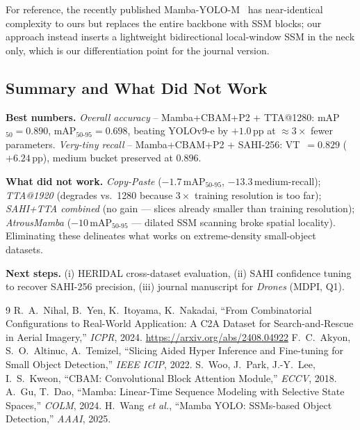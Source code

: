 \documentclass[11pt,a4paper]{article}
\begin{document}
For reference, the recently published Mamba-YOLO-M~\cite{wang2025mambayolo}
has near-identical complexity to ours but replaces the entire backbone
with SSM blocks; our approach instead inserts a lightweight
bidirectional local-window SSM in the neck only, which is our
differentiation point for the journal version.

\subsection{Summary and What Did Not Work}
\textbf{Best numbers.} \emph{Overall accuracy} -- Mamba+CBAM+P2 +
TTA@1280: mAP$_{50}\!=\!0.890$, mAP$_{50\text{-}95}\!=\!0.698$,
beating YOLOv9-e by $+1.0$\,pp at $\approx\!3\times$ fewer parameters.
\emph{Very-tiny recall} -- Mamba+CBAM+P2 + SAHI-256: VT~$=0.829$
($+6.24$\,pp), medium bucket preserved at $0.896$.

\textbf{What did not work.} \emph{Copy-Paste}
($-1.7$\,mAP$_{50\text{-}95}$, $-13.3$\,medium-recall);
\emph{TTA@1920} (degrades vs.\ 1280 because $3\times$ training
resolution is too far); \emph{SAHI+TTA combined} (no gain — slices
already smaller than training resolution); \emph{AtrousMamba}
($-10$\,mAP$_{50\text{-}95}$ — dilated SSM scanning broke spatial
locality). Eliminating these delineates what works on extreme-density
small-object datasets.

\textbf{Next steps.} (i) HERIDAL cross-dataset evaluation, (ii) SAHI
confidence tuning to recover SAHI-256 precision, (iii) journal
manuscript for \emph{Drones} (MDPI, Q1).

\begin{thebibliography}{9}\small
{}
R.~A.~Nihal, B.~Yen, K.~Itoyama, K.~Nakadai, ``From Combinatorial
Configurations to Real-World Application: A C2A Dataset for
Search-and-Rescue in Aerial Imagery,'' \emph{ICPR}, 2024.
\url{https://arxiv.org/abs/2408.04922}
F.~C.~Akyon, S.~O.~Altinuc, A.~Temizel, ``Slicing Aided Hyper Inference
and Fine-tuning for Small Object Detection,'' \emph{IEEE ICIP}, 2022.
S.~Woo, J.~Park, J.-Y.~Lee, I.~S.~Kweon, ``CBAM: Convolutional Block
Attention Module,'' \emph{ECCV}, 2018.
A.~Gu, T.~Dao, ``Mamba: Linear-Time Sequence Modeling with Selective
State Spaces,'' \emph{COLM}, 2024.
H.~Wang \emph{et al.}, ``Mamba YOLO: SSMs-based Object Detection,''
\emph{AAAI}, 2025.
\end{thebibliography}
\end{document}
